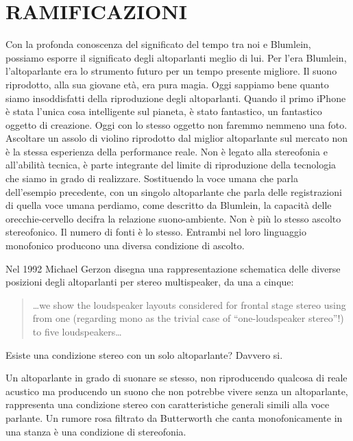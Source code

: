 \section{RAMIFICAZIONI}

Con la profonda conoscenza del significato del tempo tra noi e Blumlein,
possiamo esporre il significato degli altoparlanti meglio di lui. Per l'era
Blumlein, l'altoparlante era lo strumento futuro per un tempo presente migliore.
Il suono riprodotto, alla sua giovane età, era pura magia. Oggi sappiamo bene
quanto siamo insoddisfatti della riproduzione degli altoparlanti. Quando il
primo iPhone è stata l'unica cosa intelligente sul pianeta, è stato fantastico,
un fantastico oggetto di creazione. Oggi con lo stesso oggetto non faremmo
nemmeno una foto. Ascoltare un assolo di violino riprodotto dal miglior
altoparlante sul mercato non è la stessa esperienza della performance reale.
Non è legato alla stereofonia e all'abilità tecnica, è parte integrante del
limite di riproduzione della tecnologia che siamo in grado di realizzare.
%
Sostituendo la voce umana che parla dell'esempio precedente, con un singolo
altoparlante che parla delle registrazioni di quella voce umana perdiamo, come
descritto da Blumlein, la capacità delle orecchie-cervello decifra la relazione
suono-ambiente. Non è più lo stesso ascolto stereofonico. Il numero di fonti è
lo stesso. Entrambi nel loro linguaggio monofonico producono una diversa
condizione di ascolto.%

Nel 1992 Michael Gerzon \cite{mg92pdmsss} disegna una rappresentazione
schematica delle diverse posizioni degli altoparlanti per stereo multispeaker,
da una a cinque:

\begin{quotation}
\ldots we show the loudspeaker layouts considered for frontal stage stereo
using from one (regarding mono as the trivial case of “one-loudspeaker stereo”!)
to five loudspeakers…
\end{quotation}

Esiste una condizione stereo con un solo altoparlante? Davvero si.

Un altoparlante in grado di suonare se stesso, non riproducendo qualcosa di
reale acustico ma producendo un suono che non potrebbe vivere senza un
altoparlante, rappresenta una condizione stereo con caratteristiche generali
simili alla voce parlante. Un rumore rosa filtrato da Butterworth che canta
monofonicamente in una stanza è una condizione di stereofonia.

